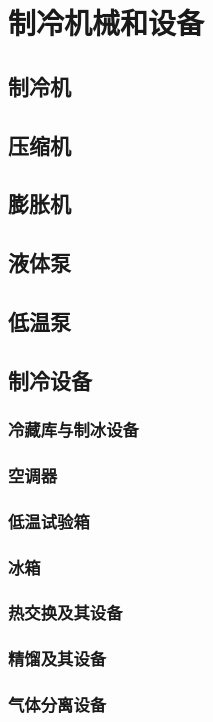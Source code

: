 \documentclass[UTF8]{../../ApplicationUniverse}
\begin{document}
\section{制冷机械和设备}
    \subsection{制冷机}
    \subsection{压缩机}
    \subsection{膨胀机}
    \subsection{液体泵}
    \subsection{低温泵}
    \subsection{制冷设备}
        \subsubsection{冷藏库与制冰设备}
        \subsubsection{空调器}
        \subsubsection{低温试验箱}
        \subsubsection{冰箱}
        \subsubsection{热交换及其设备}
        \subsubsection{精馏及其设备}
        \subsubsection{气体分离设备}
\end{document}
